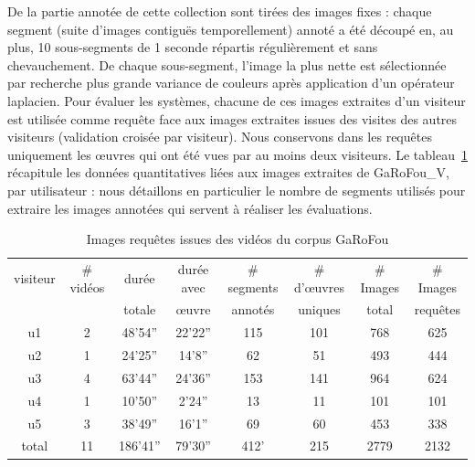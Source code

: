 De la partie annotée de cette collection sont tirées des images fixes : chaque segment (suite d'images contiguës temporellement) annoté a été découpé en, au plus, 10 sous-segments de 1 seconde répartis régulièrement et sans chevauchement. De chaque sous-segment, l'image la plus nette est sélectionnée par recherche plus grande variance de couleurs après application d'un opérateur laplacien. Pour évaluer les systèmes, chacune de ces images extraites d'un visiteur est utilisée comme requête face aux images extraites issues des visites des autres visiteurs (validation croisée par visiteur). Nous conservons dans les requêtes uniquement les œuvres qui ont été vues par au moins deux visiteurs. 
Le tableau~\ref{tab:video_garofou_visiteur} récapitule les données quantitatives liées aux images extraites de GaRoFou\_V, par utilisateur : nous détaillons en particulier le nombre de segments utilisés pour extraire les images annotées qui servent à réaliser les évaluations.

\begin{table}[htb]
    \centering
    \begin{tabular}{| c | c | c | c | c | c | c | c | }
    \hline 
    visiteur & \# vidéos & durée   & durée avec &\# segments   & \# d'œuvres & \# Images & \# Images \\
      	     &           & totale  & œuvre      & annotés    & uniques     & total     & requêtes  \\
    \hline    
    \hline    
    u1       & 2         & 48'54'' & 22'22''    & 115        & 101        & 768       & 625       \\
    u2       & 1         & 24'25'' & 14'8''     & 62         & 51         & 493       & 444       \\ 
    u3       & 4         & 63'44'' & 24'36''    & 153        & 141        & 964       & 624       \\ 
    u4       & 1         & 10'50'' & 2'24''     & 13         & 11         & 101       & 101       \\ 
    u5       & 3         & 38'49'' & 16'1''     & 69         & 60         & 453       & 338       \\
    \hline
    total    & 11        & 186'41''& 79'30''    & 412'       & 215        & 2779      & 2132      \\
    \hline
    \end{tabular}
    \caption{Images requêtes issues des vidéos du corpus GaRoFou}
    \label{tab:video_garofou_visiteur}
\end{table}

